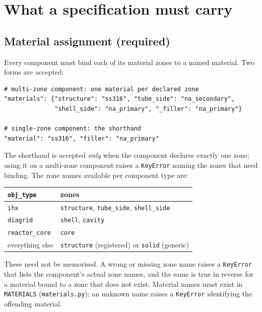 \documentclass[9pt,a4paper]{extarticle}
\newcommand{\code}[1]{\texttt{\small #1}}
\newcommand{\file}[1]{\texttt{\small #1}}
\begin{document}
\section{What a specification must carry}
\label{sec:specs}

\subsection{Material assignment (required)}

Every component must bind each of its material zones to a named material. Two
forms are accepted:

\begin{lstlisting}[style=py]
# multi-zone component: one material per declared zone
"materials": {"structure": "ss316", "tube_side": "na_secondary",
              "shell_side": "na_primary", "_filler": "na_primary"}

# single-zone component: the shorthand
"material": "ss316", "filler": "na_primary"
\end{lstlisting}

\noindent
The shorthand is accepted \emph{only} when the component declares exactly one
zone; using it on a multi-zone component raises a \code{KeyError} naming the
zones that need binding. The zone names available per component type are:

\begin{center}
\begin{tabular}{@{}ll@{}}
\toprule
\code{obj\_type} & zones \\
\midrule
\code{ihx}          & \code{structure}, \code{tube\_side}, \code{shell\_side} \\
\code{diagrid}      & \code{shell}, \code{cavity} \\
\code{reactor\_core}& \code{core} \\
everything else     & \code{structure} (registered) or \code{solid} (generic) \\
\bottomrule
\end{tabular}
\end{center}

\noindent
These need not be memorised. A wrong or missing zone name raises a
\code{KeyError} that lists the component's actual zone names, and the same is
true in reverse for a material bound to a zone that does not exist. Material
names must exist in \code{MATERIALS} (\file{materials.py}); an unknown name
raises a \code{KeyError} identifying the offending material.
\end{document}
